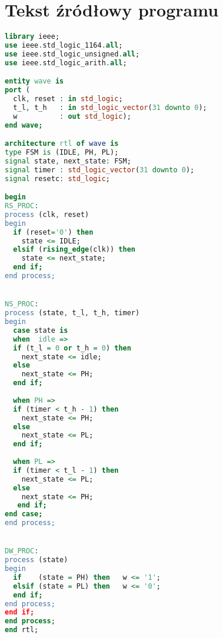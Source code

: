 \chapter{Tekst źródłowy programu}


\begin{lstlisting}[language=VHDL,xleftmargin=0pt,  backgroundcolor={\color{white}}, caption={}, frame=""]
library ieee;
use ieee.std_logic_1164.all;
use ieee.std_logic_unsigned.all;
use ieee.std_logic_arith.all;

entity wave is
port (
  clk, reset : in std_logic;                           
  t_l, t_h   : in std_logic_vector(31 downto 0);  
  w          : out std_logic);
end wave;

architecture rtl of wave is
type FSM is (IDLE, PH, PL);
signal state, next_state: FSM;
signal timer : std_logic_vector(31 downto 0);
signal resetc: std_logic;

begin
RS_PROC:
process (clk, reset)
begin
  if (reset='0') then 
    state <= IDLE;
  elsif (rising_edge(clk)) then
    state <= next_state;
  end if;
end process;


NS_PROC:
process (state, t_l, t_h, timer)
begin
  case state is
  when  idle =>
  if (t_l = 0 or t_h = 0) then 
    next_state <= idle;
  else 
    next_state <= PH;
  end if;
  
  when PH =>  
  if (timer < t_h - 1) then  
    next_state <= PH;
  else
    next_state <= PL;
  end if;
    
  when PL =>
  if (timer < t_l - 1) then
    next_state <= PL;
  else
    next_state <= PH;    
   end if;    
end case;
end process;


DW_PROC:
process (state)
begin
  if    (state = PH) then   w <= '1';
  elsif (state = PL) then   w <= '0';
  end if;
end process;
end if;
end process;
end rtl;
\end{lstlisting}